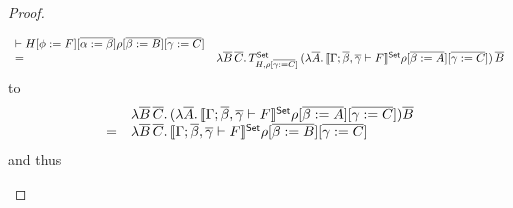 \documentclass[acmsmall,review,anonymous]{acmart}
\theoremstyle{definition}
\begin{document}
\begin{proof}
\begin{itemize}
\[\begin{array}{ll}
{  \vdash H[\phi := F][\overline{\alpha := \beta}]}\rho[\overline{\beta :=
    B}][\overline{\gamma := C}]\\
= & \lambda \overline{B}\,\overline{C}.\,T^{\mathsf{Set}}_{H,\rho[\overline{\gamma:=
     C}]}\,(\lambda \overline{A}. \, \llbracket{\Gamma;\overline{\beta},\overline{\gamma} 
  \vdash F}\rrbracket^{\mathsf{Set}}\rho[\overline{\beta := A}][\overline{\gamma := C}]) \, \overline{B}
\end{array}\]
to
\[\begin{array}{ll}
 & \lambda \overline{B}\,\overline{C}.\,(\lambda
\overline{A}.\,\llbracket{\Gamma;\overline{\beta},\overline{\gamma} \vdash F}\rrbracket^{\mathsf{Set}}\rho[\overline{\beta
    := A}][\overline{\gamma := C}]) \overline{B}\\
= & \lambda
\overline{B}\,\overline{C}.\,\llbracket{\Gamma;\overline{\beta},\overline{\gamma} \vdash
  F}\rrbracket^{\mathsf{Set}}\rho[\overline{\beta := B}][\overline{\gamma := C}]
\end{array}\]
and thus

\end{itemize}
\end{proof}
\end{document}

